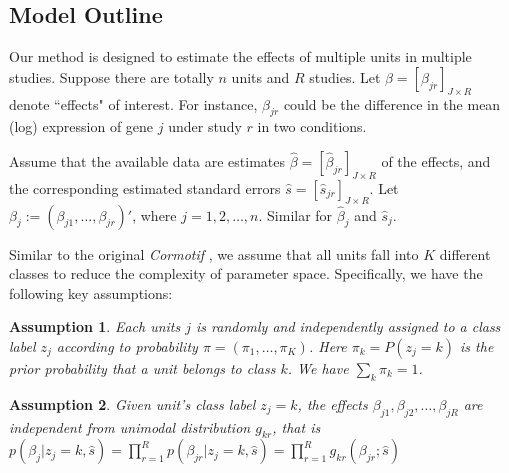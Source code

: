 \documentclass[12pt]{article}
\newtheorem{assumption}{Assumption}
\begin{document}
\vspace{5mm}
\subsection{Model Outline}

\vspace{4mm} Our method is designed to estimate the effects of multiple units in multiple studies. Suppose there are totally $n$ units and $R$ studies. Let $\beta = [\beta_{jr}]_{J\times R}$ denote ``effects" of interest. For instance, $\beta_{jr}$ could be the difference in the mean (log) expression of gene $j$ under study $r$ in two conditions. 

\vspace{4mm}\noindent Assume that the available data are estimates $\hat \beta = [\hat \beta_{jr}]_{J\times R}$ of the effects, and the corresponding estimated standard errors $\hat s = [\hat s_{jr}]_{J\times R}$. Let $\beta_j:=(\beta_{j1},\ldots,\beta_{jr})'$, where $j=1,2,\ldots,n$. Similar for $\hat \beta_j$ and $\hat s_j$.

\vspace{4mm}\noindent Similar to the original \emph{Cormotif} \cite{Wei2015}, we assume that all units fall into $K$ different classes to reduce the complexity of parameter space. Specifically, we have the following key assumptions:

\begin{assumption}Each units $j$ is randomly and independently assigned to a class label $z_j$ according to probability $\pi=(\pi_1,\ldots,\pi_K)$. Here $\pi_k=P(z_j=k)$ is the prior probability that a unit belongs to class $k$. We have $\sum_k\pi_k = 1$.
\end{assumption}
 
\begin{assumption}Given unit's class label $z_j=k$, the effects $\beta_{j1},\beta_{j2},\ldots,\beta_{jR}$ are independent from unimodal distribution $g_{kr}$, that is $p(\beta_{j}|z_j =k,\hat s)=\prod_{r=1}^R p(\beta_{jr}|z_j =k,\hat s)=\prod_{r=1}^Rg_{kr}( \beta_{jr};\hat s)$
\end{assumption}
\end{document}
